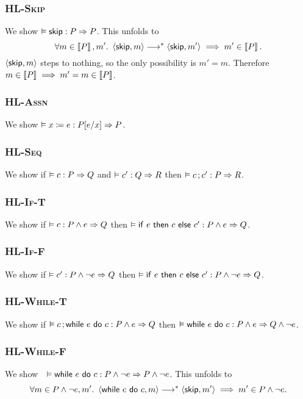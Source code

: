 \documentclass[10pt]{article}
\theoremstyle{definition}
\begin{document}
\subsubsection*{\textsc{HL-Skip}}
We show $\VAL \Triple \Skip : P => P$.
This unfolds to 
$$\forall m \in \Interp{P}, m'.\
\Cfg(\Skip,m) \sstepstotrans \Cfg(\Skip,m') \implies
m' \in \Interp{P}.$$
$\Cfg(\Skip,m)$ steps to nothing,
so the only possibility is $m' = m$.
Therefore $m \in \left\llbracket P \right\rrbracket \implies m' = m \in \left\llbracket P \right\rrbracket$.

\subsubsection*{\textsc{HL-Assn}}
We show $\VAL \Triple \Assn x = e : \Subst P[e/x] => P$.

\subsubsection*{\textsc{HL-Seq}}
We show if $\VAL \Triple c : P => Q$ and $\VAL \Triple c' : Q => R$
then $\VAL \Triple \Seq c;c' : P => R$.
    
\subsubsection*{\textsc{HL-If-T}}
We show if $\VAL \Triple c : P \wedge e => Q$ then
    $\VAL \Triple \ITE e then c else c' : P \wedge e => Q$.

\subsubsection*{\textsc{HL-If-F}}
We show if $\VAL \Triple c' : P \wedge \neg e => Q$ then
    $\VAL \Triple \ITE e then c else c' : P \wedge \neg e => Q$.
\todo{todo}

\subsubsection*{\textsc{HL-While-T}}
We show if $\VAL \Triple \Seq c; \While e do c : P \wedge e => Q$ then
    $\VAL \Triple \While e do c : P \wedge e => Q \wedge \neg e$. 
\todo{todo}

\subsubsection*{\textsc{HL-While-F}}
We show~~$\VAL \Triple \While e do c : P \wedge \neg e => P \wedge \neg e$.
This unfolds to
$$\forall m \in P \wedge \neg e, m'.\
\Cfg(\While e do c,m) \sstepstotrans \Cfg(\Skip,m') \implies
m' \in P \wedge \neg e.$$
\end{document}
